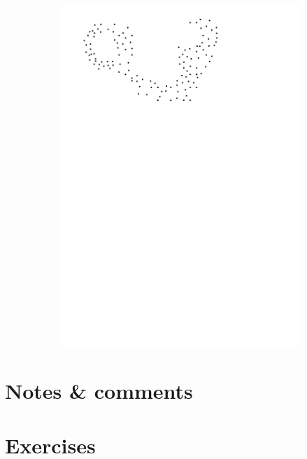 \begin{figure}[h]
\begin{subfigure}[b]{0.22\linewidth}
    \includegraphics[page=4,width=\textwidth]{figs/idea.pdf}
  \end{subfigure}
\end{figure}


%
\section{Notes \& comments}



%
\section{Exercises}

